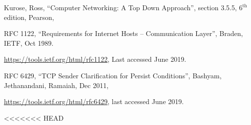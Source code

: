 \begin{multicols}{2}
\begin{thebibliography}{99}
 Kurose, Ross, “Computer Networking: A Top Down Approach”, section 3.5.5, $6^{\text{th}}$ edition, Pearson, 

RFC 1122, “Requirements for Internet Hosts -- Communication Layer”, Braden, IETF, Oct 1989. 

\url{https://tools.ietf.org/html/rfc1122}, Last accessed June 2019.

 RFC 6429, “TCP Sender Clarification for Persist Conditions”, Bashyam, Jethanandani, Ramaiah, Dec 2011, 

\url{https://tools.ietf.org/html/rfc6429}, last accessed June 2019.

\end{thebibliography}
\end{multicols}

<<<<<<< HEAD


